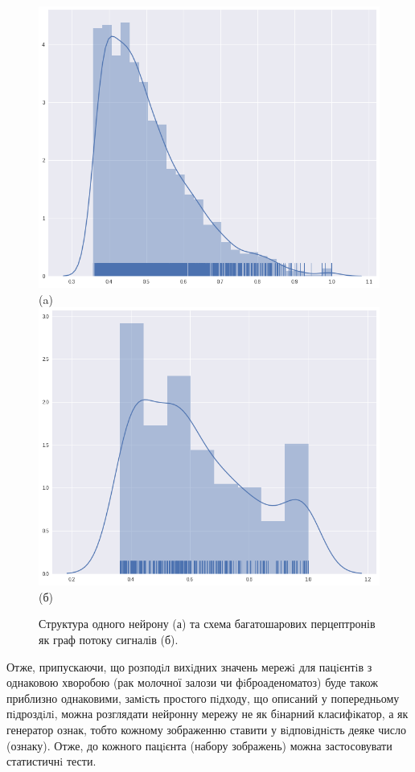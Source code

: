 \begin{figure}[t!]
	\includegraphics[width=0.95\linewidth]{Figures/Chapter4/test_dist_cancer.png}\\
	(a)
	\endminipage\hfill
	\centering	
	\includegraphics[width=0.95\linewidth]{Figures/Chapter4/test_dist_fibro.png}\\
	(б)
	\endminipage\hfill
	
	\caption{Структура одного нейрону (а) та схема багатошарових перцептронів як граф потоку сигналів (б).}
	\label{fig:train_distribution}
\end{figure}

Отже, припускаючи, що розподiл вихiдних значень мережi для пацiєнтiв з однаковою хворобою (рак молочної залози чи фiброаденоматоз) буде також приблизно однаковими, замiсть простого пiдходу, що описаний у попередньому пiдроздiлi, можна розглядати нейронну мережу не як бiнарний класифiкатор, а як генератор ознак, тобто кожному зображенню ставити у вiдповiднiсть деяке число (ознаку). Отже, до кожного пацiєнта (набору зображень) можна застосовувати статистичнi тести.



